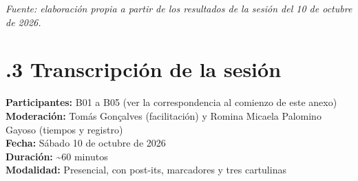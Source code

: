 \noindent\textit{Fuente: elaboración propia a partir de los resultados de la sesión del 10 de octubre de 2026.}

\FloatBarrier

\section*{\thechapter.3 Transcripción de la sesión}

\noindent\textbf{Participantes:} B01 a B05 (ver la correspondencia al comienzo de este anexo)\\
\noindent\textbf{Moderación:} Tomás Gonçalves (facilitación) y Romina Micaela Palomino Gayoso (tiempos y registro)\\
\noindent\textbf{Fecha:} Sábado 10 de octubre de 2026\\
\noindent\textbf{Duración:} \textasciitilde60 minutos\\
\noindent\textbf{Modalidad:} Presencial, con post-its, marcadores y tres cartulinas


